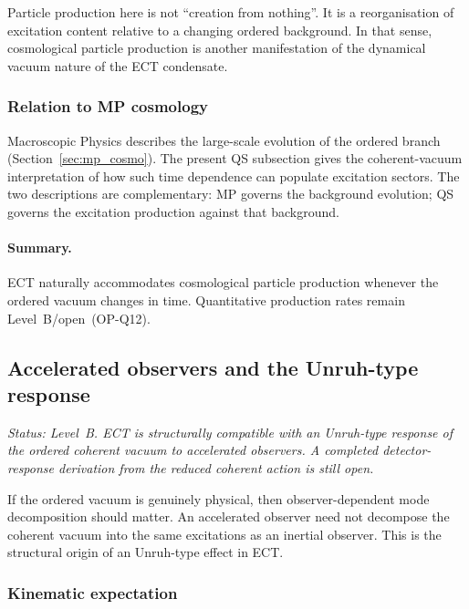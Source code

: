\documentclass[11pt,a4paper]{article}
\numberwithin{equation}{section}
\begin{document}
Particle production here is not ``creation from nothing''.
It is a reorganisation of excitation content relative to a changing
ordered background.
In that sense, cosmological particle production is another
manifestation of the dynamical vacuum nature of the ECT condensate.

\subsubsection*{Relation to MP cosmology}

Macroscopic Physics describes the large-scale evolution of the ordered
branch (Section~\ref{sec:mp_cosmo}).
The present QS subsection gives the coherent-vacuum interpretation of
how such time dependence can populate excitation sectors.
The two descriptions are complementary: MP governs the background
evolution; QS governs the excitation production against that background.

\paragraph{Summary.}
ECT naturally accommodates cosmological particle production whenever
the ordered vacuum changes in time.
Quantitative production rates remain Level~B/open~(OP-Q12).

\subsection{Accelerated observers and the Unruh-type response}
\label{sec:qs_unruh}
\label{sec:unruh}

\textit{Status: Level~B.
ECT is structurally compatible with an Unruh-type response of the
ordered coherent vacuum to accelerated observers.
A completed detector-response derivation from the reduced coherent
action is still open.}

\medskip
If the ordered vacuum is genuinely physical, then observer-dependent
mode decomposition should matter.
An accelerated observer need not decompose the coherent vacuum into the
same excitations as an inertial observer.
This is the structural origin of an Unruh-type effect in ECT.

\subsubsection*{Kinematic expectation}
\end{document}
